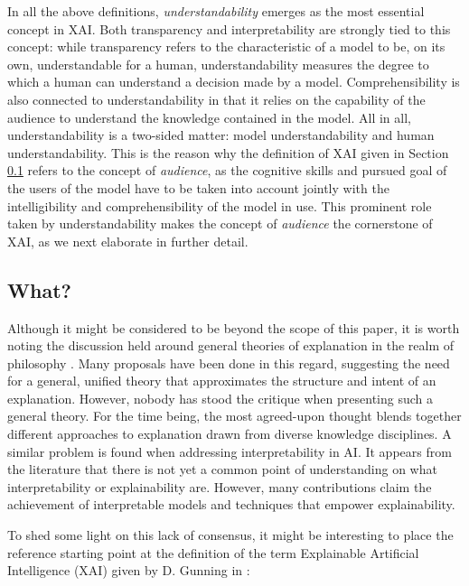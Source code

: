 \documentclass[final]{elsarticle}
\begin{document}
{\color{black}In all the above definitions, \emph{understandability} emerges as the most essential concept in XAI. Both transparency and interpretability are strongly tied to this concept: while transparency refers to the characteristic of a model to be, on its own, understandable for a human, understandability measures the degree to which a human can understand a decision made by a model. Comprehensibility is also connected to understandability in that it relies on the capability of the audience to understand the knowledge contained in the model. All in all, understandability is a two-sided matter: model understandability and human understandability. This is the reason why the definition of XAI given in Section \ref{sec:what} refers to the concept of \emph{audience}, as the cognitive skills and pursued goal of the users of the model have to be taken into account jointly with the intelligibility and comprehensibility of the model in use. This prominent role taken by understandability makes the concept of \emph{audience} the cornerstone of XAI, as we next elaborate in further detail}.

\subsection{What?} \label{sec:what}

Although it might be considered to be beyond the scope of this paper, it is worth noting the discussion held around general theories of explanation in the realm of philosophy \cite{diez2013Explanations}. Many proposals have been done in this regard, suggesting the need for a general, unified theory that approximates the structure and intent of an explanation. However, nobody has stood the critique when presenting such a general theory. For the time being, the most agreed-upon thought blends together different approaches to explanation drawn from diverse knowledge disciplines. A similar problem is found when addressing interpretability in AI. It appears from the literature that there is not yet a common point of understanding on what interpretability or explainability are. However, many contributions claim the achievement of interpretable models and techniques that empower explainability. 

To shed some light on this lack of consensus, it might be interesting to place the reference starting point at the definition of the term Explainable Artificial Intelligence (XAI) given by D. Gunning in \cite{gunning2017explainable}:
\begin{center}
\noindent{}
\end{center}
\end{document}
